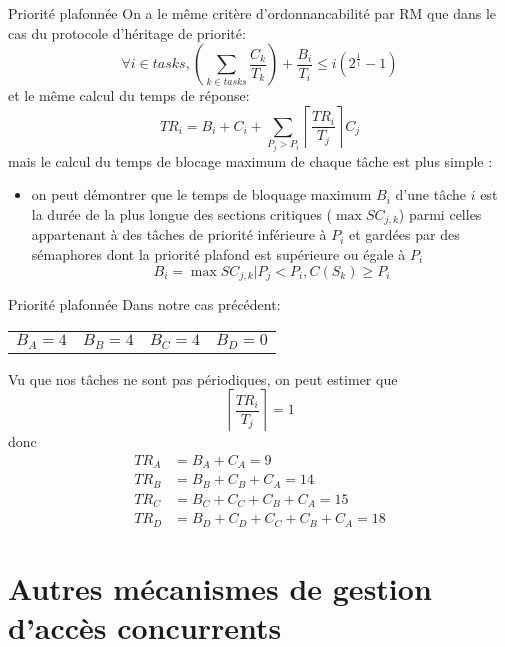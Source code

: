 \begin{frame}{Priorité plafonnée}
  On a  le même critère d'ordonnancabilité  par RM que dans  le cas du
  protocole d'héritage de priorité:
  $$\forall i \in tasks, \left( \sum_{k \in tasks} \frac{C_k}{T_k} \right) + \frac{B_i}{T_i} ≤ i \left(2^{\frac{1}{i}}-1\right)$$
  et le même calcul du temps de réponse:
  $$TR_i = B_i + C_i + \sum_{P_j > P_i} \left\lceil\frac{TR_i}{T_j}\right\rceil C_j$$
  mais le calcul du temps de  blocage maximum de chaque tâche est plus
  simple :
  \begin{itemize}
  \item on peut démontrer que le temps de bloquage maximum $B_i$ d'une
    tâche $i$  est la durée de  la plus longue  des sections critiques
    ($\max  SC_{j,k}$)  parmi  celles  appartenant  à  des  tâches  de
    priorité inférieure à $P_i$ et  gardées par des sémaphores dont la
    priorité plafond est supérieure ou égale à $P_i$
    $$B_i = \max SC_{j,k} | P_j < P_i, C(S_k) ≥ P_i$$
  \end{itemize}
\end{frame}

\begin{frame}{Priorité plafonnée}
  Dans notre cas précédent:
  \begin{center}
    \begin{tabular}{cccc}
      $B_A = 4$ & $B_B = 4$ & $B_C = 4$ & $B_D = 0$\\
    \end{tabular}
  \end{center}
  Vu que nos tâches ne sont pas périodiques, on peut estimer que 
  $$ \left\lceil\frac{TR_i}{T_j}\right\rceil = 1 $$
  donc
  \begin{align*}
    TR_A &= B_A + C_A = 9\\
    TR_B &= B_B + C_B + C_A = 14\\
    TR_C &= B_C + C_C + C_B + C_A = 15\\
    TR_D &= B_D + C_D + C_C + C_B + C_A = 18
  \end{align*}
\end{frame}


\section{Autres mécanismes de gestion d'accès concurrents}


